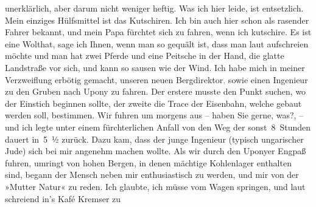 \begin{ledgroupsized}[t]{13cm}
               unerklärlich, aber darum nicht weniger heftig. Was ich hier leide, ist entsetzlich. Mein einziges
               Hülfsmittel ist das Kutschiren. Ich bin auch hier schon als rasender Fahrer bekannt,
               und mein Papa fürchtet sich
               zu fahren, wenn ich kutschire. Es ist eine Wolthat, sage ich Ihnen, wenn man so
               gequält ist, dass man laut aufschreien möchte und man hat zwei Pferde und eine
               Peitsche in der Hand, die glatte Landstraße vor sich, und kann so sausen wie der
               Wind. Ich habe mich in meiner Verzweiflung erbötig gemacht, unseren neuen Bergdirektor\textcolor{gray}{,} sowie einen Ingenieur zu den Gruben nach Upony zu
               fahren. Der erstere musste den Punkt suchen, wo der Einstich beginnen sollte, der
               zweite die Trace der Eisenbahn, welche gebaut werden soll, bestimmen. Wir fuhren um  morgens aus – haben Sie gerne, was?,
               – und ich legte unter einem fürchterlichen Anfall von \label{K_L03105-3v}\label{K_L03105-3h} den Weg der sonst 8 Stunden dauert in 5 ½{ }zurück. Dazu kam, dass der
               junge Ingenieur (typisch
                  ungarischer Jude) sich bei
               mir angenehm machen wollte. Als wir durch den Uponyer Engpaß fuhren, umringt von hohen Bergen, in denen mächtige
               Kohlenlager enthalten sind, be{\pb}gann der Mensch neben mir
               enthusiastisch zu werden, und mir von der »Mutter Natur« zu reden. Ich glaubte, ich
               müsse vom Wagen springen, und laut schreiend in’s Kafé Kremser zu

\end{ledgroupsized}

